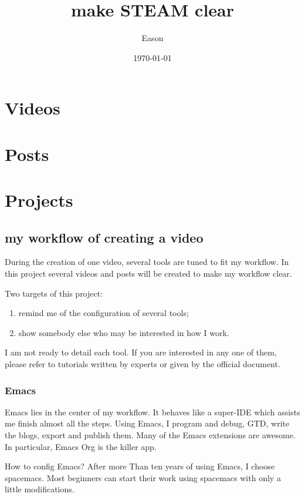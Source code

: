\documentclass[koma,utopia,letterpaper,captions=tableheading,11pt,listings-sv,microtype,paralist,colorlinks=true,urlcolor=blue]{org-article}
\author{Eason}
\date{\today}
\title{make STEAM clear}
\begin{document}
\maketitle
\tableofcontents


\section{Videos}
\label{sec:orgd3ae832}



\section{Posts}
\label{sec:org7648261}


\section{Projects}
\label{sec:orgec1d3eb}


\subsection{my workflow of creating a video}
\label{sec:org3bbb651}
During the creation of one video, several tools are tuned to fit my workflow. In
this project several videos and posts will be created to make my workflow clear.

Two targets of this project:
\begin{enumerate}
\item remind me of the configuration of several tools;
\item show somebody else who may be interested in how I work.
\end{enumerate}

I am not ready to detail each tool. If you are interested in any one of them,
please refer to tutorials written by experts or given by the official document.

\subsubsection{Emacs}
\label{sec:org42d9799}


Emacs lies in the center of my workflow. It behaves like a super-IDE which
assists me finish almost all the steps. Using Emacs, I program and debug, GTD,
write the blogs, export and publish them. Many of the Emacs extensions are
awesome. In particular, Emacs Org is the killer app.

How to config Emacs? After more Than ten years of using Emacs, I choose
spacemacs. Most beginners can start their work using spacemacs with only a
little modifications.
\end{document}
